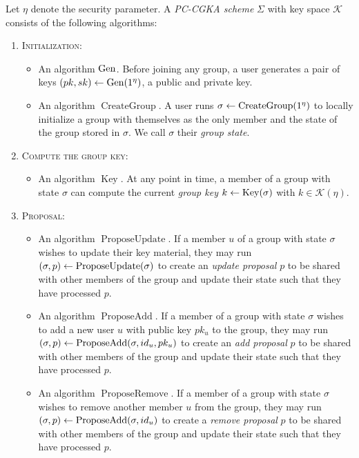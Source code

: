 \begin{definition}[PC-CGKA]
	Let $\eta$ denote the security parameter.
	A \emph{PC-CGKA scheme} $\Sigma$ with key space $\mathcal{K}$ consists of the following algorithms:
	\begin{enumerate}[1.]
		\item[] \textsc{Initialization:}
			\begin{itemize}
				\item An algorithm $\mathrm{Gen}$. Before joining any group, a user generates a pair of keys $(pk, sk) \leftarrow \mathrm{Gen}(1^\eta)$, a public and private key.
				\item An algorithm $\operatorname{CreateGroup}$. A user runs $\sigma \leftarrow \operatorname{CreateGroup}(1^\eta)$ to locally initialize a group with themselves as the only member and the state of the group stored in $\sigma$. We call $\sigma$ their \emph{group state}.
			\end{itemize}
		\item[] \textsc{Compute the group key:}
			\begin{itemize}
				\item An algorithm $\operatorname{Key}$. At any point in time, a member of a group with state $\sigma$ can compute the current \emph{group key} $k \leftarrow \operatorname{Key}(\sigma)$ with $k \in \mathcal{K}(\eta)$.
			\end{itemize}
		\item[] \textsc{Proposal:}
			\begin{itemize}
				\item An algorithm $\operatorname{ProposeUpdate}$. If a member $u$ of a group with state $\sigma$ wishes to update their key material, they may run $(\sigma, p) \leftarrow \operatorname{ProposeUpdate}(\sigma)$ to create an \emph{update proposal} $p$ to be shared with other members of the group and update their state such that they have processed $p$.
				\item An algorithm $\operatorname{ProposeAdd}$. If a member of a group with state $\sigma$ wishes to add a new user $u$ with public key $pk_u$ to the group, they may run $(\sigma, p) \leftarrow \operatorname{ProposeAdd}(\sigma, id_u, pk_u)$ to create an \emph{add proposal} $p$ to be shared with other members of the group and update their state such that they have processed $p$.
				\item An algorithm $\operatorname{ProposeRemove}$. If a member of a group with state $\sigma$ wishes to remove another member $u$ from the group, they may run $(\sigma, p) \leftarrow \operatorname{ProposeAdd}(\sigma, id_u)$ to create a \emph{remove proposal} $p$ to be shared with other members of the group and update their state such that they have processed $p$.

\end{itemize}
\end{enumerate}
\end{definition}
